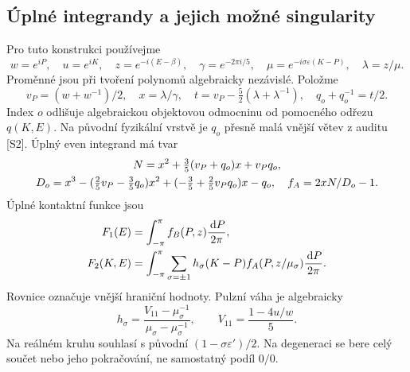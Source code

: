 \documentclass[11pt,a4paper]{article}
\newcommand{\dd}{\,\mathrm d}
\newcommand{\eps}{\varepsilon}
\theoremstyle{remark}\newtheorem{remark}[theorem]{Poznámka}
\numberwithin{equation}{section}
\begin{document}
\subsection{Úplné integrandy a jejich možné singularity}

Pro tuto konstrukci používejme
\[
w=e^{iP},\quad u=e^{iK},\quad z=e^{-i(E-\beta)},
\quad\gamma=e^{-2\pi i/5},\quad
\mu=e^{-i\sigma\eps(K-P)},\quad\lambda=z/\mu.
\]
Proměnné jsou při tvoření polynomů algebraicky nezávislé. Položme
\[
v_P=(w+w^{-1})/2,\quad x=\lambda/\gamma,\quad
t=v_P-\tfrac52(\lambda+\lambda^{-1}),
\quad q_o+q_o^{-1}=t/2.
\]
Index \(o\) odlišuje algebraickou objektovou odmocninu od pomocného odřezu \(q(K,E)\). Na původní fyzikální vrstvě je \(q_o\) přesně malá vnější větev z auditu [S2]. Úplný even integrand má tvar
\begin{gather}
N=x^2+\tfrac35(v_P+q_o)x+v_Pq_o,\notag\\
D_o=x^3-(\tfrac25v_P-\tfrac35q_o)x^2
 +(-\tfrac35+\tfrac25v_Pq_o)x-q_o,
\quad f_A=2xN/D_o-1.
\label{eq:evenfull}
\end{gather}
Úplné kontaktní funkce jsou
\begin{align}
F_1(E)&=\int_{-\pi}^{\pi}f_B(P,z)\frac{\dd P}{2\pi},\notag\\
F_2(K,E)&=\int_{-\pi}^{\pi}\sum_{\sigma=\pm1}
h_\sigma(K-P)f_A(P,z/\mu_\sigma)\frac{\dd P}{2\pi}.
\label{eq:periods}
\end{align}
Rovnice označuje vnější hraniční hodnoty. Pulzní váha je algebraicky
\[
h_\sigma=\frac{V_{11}-\mu_\sigma^{-1}}{
\mu_\sigma-\mu_\sigma^{-1}},\qquad
V_{11}=\frac{1-4u/w}{5}.
\]
Na reálném kruhu souhlasí s původní \((1-\sigma\eps')/2\). Na degeneraci se bere celý součet nebo jeho pokračování, ne samostatný podíl \(0/0\).
\end{document}
